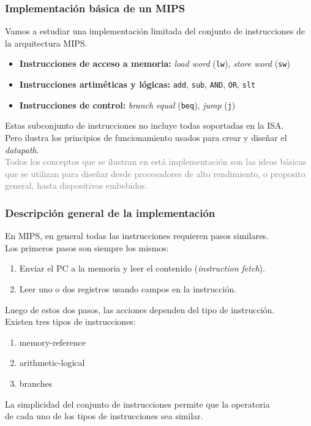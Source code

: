\documentclass[aspectratio=169]{beamer}
\begin{document}
\begin{frame}[t,fragile]
    \frametitle{Implementación básica de un MIPS}
    Vamos a estudiar una implementación limitada del conjunto de instrucciones de la arquitectura MIPS.\\    
    \begin{itemize}
    \item \textcolor{verdeuca}{\textbf{Instrucciones de acceso a memoria:}} \emph{load word} (\texttt{lw}), \emph{store word} (\texttt{sw})
    \item \textcolor{verdeuca}{\textbf{Instrucciones artiméticas y lógicas:}} \texttt{add}, \texttt{sub}, \texttt{AND}, \texttt{OR}, \texttt{slt}
    \item \textcolor{verdeuca}{\textbf{Instrucciones de control:}} \emph{branch equal} (\texttt{beq}), \emph{jump} (\texttt{j})
    \end{itemize}
    \pause
    \bigskip
    Estas subconjunto de instrucciones no incluye todas soportadas en la ISA.\\
    \textcolor{naranjauca}{Pero ilustra los principios de funcionamiento usados para crear y diseñar el \emph{datapath}.}\\
    \bigskip
    \textcolor{gray}{Todos los conceptos que se ilustran en está implementación son las ideas básicas que se utilizan para diseñar desde procesadores de alto rendimiento, o proposito general, hasta dispositivos embebidos.}
\end{frame}

\begin{frame}[t,fragile]
    \frametitle{Descripción general de la implementación}
    En MIPS, en general todas las instrucciones requieren pasos similares.\\
    \bigskip
    Los primeros pasos son siempre los mismos:
    \begin{enumerate}
     \item Enviar el PC a la memoria y leer el contenido (\emph{instruction fetch}).
     \item Leer uno o dos registros usando campos en la instrucción.
    \end{enumerate}
    \pause
    \bigskip
    Luego de estos dos pasos, las acciones dependen del tipo de instrucción.\\
    \vspace{0.2cm}
    Existen tres tipos de instrucciones:
    \begin{enumerate}
     \item memory-reference
     \item arithmetic-logical
     \item branches
    \end{enumerate}
    \pause
    \begin{center}
    \textcolor{verdeuca}{
    La simplicidad del conjunto de instrucciones permite que la operatoria\\
    de cada uno de los tipos de instrucciones sea similar.
    }
    \end{center}
\end{frame}
\end{document}
